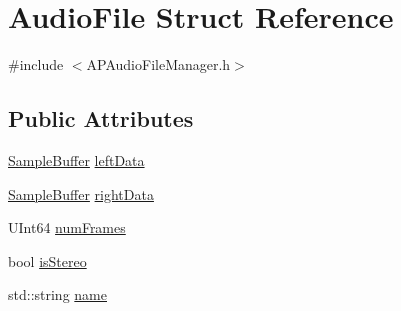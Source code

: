 \hypertarget{struct_audio_file}{\section{Audio\+File Struct Reference}
\label{struct_audio_file}
}


{\ttfamily \#include $<$A\+P\+Audio\+File\+Manager.\+h$>$}

\subsection*{Public Attributes}
\begin{DoxyCompactItemize}
\item 
\hyperlink{_a_p_audio_module_8h_a2c2f997fdc6b0e88b3723fb20dc502f0}{Sample\+Buffer} \hyperlink{struct_audio_file_a51aaf4be88a23cadc1fb07a03ea5f2b6}{left\+Data}
\item 
\hyperlink{_a_p_audio_module_8h_a2c2f997fdc6b0e88b3723fb20dc502f0}{Sample\+Buffer} \hyperlink{struct_audio_file_a15e6b7e17c2d9fddcf8b8256101b09ea}{right\+Data}
\item 
U\+Int64 \hyperlink{struct_audio_file_aa97443ea32087a1bf8274be526525236}{num\+Frames}
\item 
bool \hyperlink{struct_audio_file_a311b31a57c859cc21a1f68aff6e51ba9}{is\+Stereo}
\item 
std\+::string \hyperlink{struct_audio_file_a16db0e4afba089b08ffe10d1c0acbb60}{name}
\end{DoxyCompactItemize}


